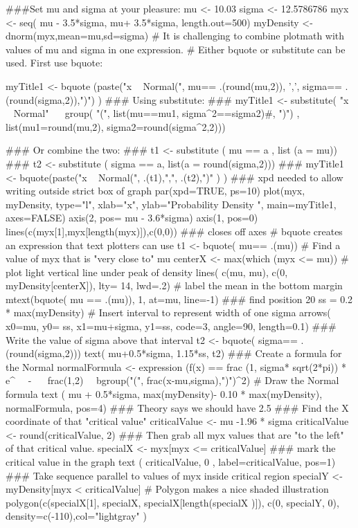 \begin{Schunk}
\begin{Sinput}
 ###Set mu and sigma at your pleasure:
 mu <- 10.03
 sigma <- 12.5786786
 myx <- seq( mu - 3.5*sigma,  mu+ 3.5*sigma, length.out=500)
 myDensity <- dnorm(myx,mean=mu,sd=sigma)
 # It is challenging to combine plotmath with values of mu and sigma in one expression.
 # Either bquote or substitute can be used.  First use bquote:
 
 myTitle1 <- bquote (paste("x ~ Normal(", mu== .(round(mu,2)), ',', sigma== .(round(sigma,2)),")") )
 ### Using substitute:
 ### myTitle1 <-  substitute( "x ~ Normal" ~~ group( "(", list(mu==mu1, sigma^2==sigma2)#, ")") ,  list(mu1=round(mu,2), sigma2=round(sigma^2,2)))
 
 ### Or combine the two:
 ### t1 <- substitute ( mu == a ,  list (a = mu))
 ### t2 <- substitute ( sigma == a, list(a = round(sigma,2)))
 ### myTitle1 <- bquote(paste("x ~ Normal(", .(t1),",", .(t2),")" ) )
 ### xpd needed to allow writing outside strict box of graph
 par(xpd=TRUE, ps=10)
 plot(myx, myDensity, type="l", xlab="x", ylab="Probability Density ", main=myTitle1, axes=FALSE)
 axis(2, pos= mu - 3.6*sigma)
 axis(1, pos=0)
 lines(c(myx[1],myx[length(myx)]),c(0,0)) ### closes off axes
 # bquote creates an expression that text plotters can use
 t1 <-  bquote( mu== .(mu))
 # Find a value of myx that is "very close to" mu
 centerX <- max(which (myx <= mu))
 # plot light vertical line under peak of density
 lines( c(mu, mu), c(0, myDensity[centerX]), lty= 14, lwd=.2)
 # label the mean in the bottom margin
 mtext(bquote( mu == .(mu)), 1, at=mu, line=-1)
 ### find position 20% "up" vertically, to use for arrow coordinate
 ss = 0.2 * max(myDensity)
 # Insert interval to represent width of one sigma
 arrows( x0=mu, y0= ss, x1=mu+sigma, y1=ss, code=3, angle=90, length=0.1)
 ### Write the value of sigma above that interval
 t2 <-  bquote( sigma== .(round(sigma,2)))
 text( mu+0.5*sigma, 1.15*ss, t2)
 ### Create a formula for the Normal
 normalFormula <- expression (f(x) == frac (1, sigma* sqrt(2*pi)) * e^{~~ - ~~ frac(1,2)~~ bgroup("(", frac(x-mu,sigma),")")^2})
 # Draw the Normal formula
 text ( mu + 0.5*sigma, max(myDensity)- 0.10 * max(myDensity),  normalFormula, pos=4)
 ### Theory says we should have 2.5% of the area to the left of: -1.96 * sigma.
 ### Find the X coordinate of that "critical value"
 criticalValue <- mu -1.96 * sigma
 criticalValue <- round(criticalValue, 2)
 ### Then grab all myx values that are "to the left" of that critical value.
 specialX <-  myx[myx <= criticalValue]
 ### mark the critical value in the graph
 text ( criticalValue, 0 ,
       label=criticalValue, pos=1)
 ### Take sequence parallel to values of myx inside critical region
 specialY <- myDensity[myx < criticalValue]
 #  Polygon makes a nice shaded illustration
 polygon(c(specialX[1], specialX, specialX[length(specialX )]), c(0, specialY, 0), density=c(-110),col="lightgray" )
\end{Sinput}
\end{Schunk}
